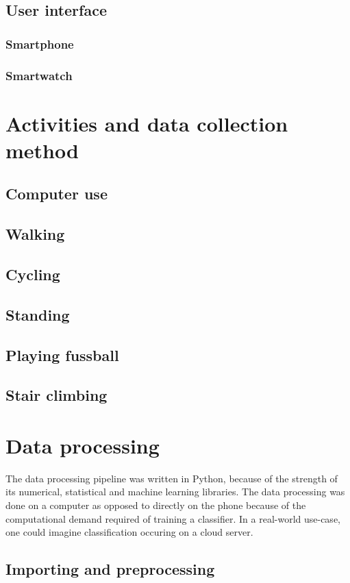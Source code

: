     \subsection{User interface}
      \subsubsection{Smartphone}
      
      \subsubsection{Smartwatch}
      
  \section{Activities and data collection method}
    \subsection{Computer use}
    \subsection{Walking}
    \subsection{Cycling}
    \subsection{Standing}
    \subsection{Playing fussball}
    \subsection{Stair climbing}
  \section{Data processing}
    The data processing pipeline was written in Python, because of the strength of its numerical, statistical and machine learning libraries. The data processing was done on a computer as opposed to directly on the phone because of the computational demand required of training a classifier. In a real-world use-case, one could imagine classification occuring on a cloud server.
    \subsection{Importing and preprocessing}
